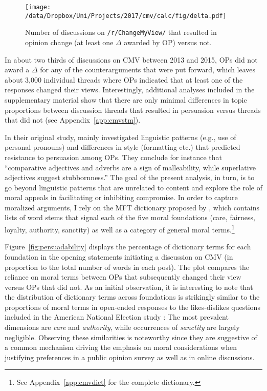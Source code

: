 \begin{figure}[ht]
\centering
\texttt{[image: /data/Dropbox/Uni/Projects/2017/cmv/calc/fig/delta.pdf]}
\caption[Number of original posts on \texttt{/r/ChangeMyView/} that resulted in opinion change]{Number of discussions on \texttt{/r/ChangeMyView/} that resulted in opinion change (at least one $\Delta$ awarded by OP) versus not.}\label{fig:delta}
\end{figure}

In about two thirds of discussions on CMV between 2013 and 2015, OPs did not award a $\Delta$ for any of the counterarguments that were put forward, which leaves about 3,000 individual threads where OPs indicated that at least one of the responses changed their views. Interestingly, additional analyses included in the supplementary material show that there are only minimal differences in topic proportions between discussion threads that resulted in persuasion versus threads that did not (see Appendix~\ref{app:cmvstm}).

In their original study, \citet{tan2016winning} mainly investigated linguistic patterns (e.g., use of personal pronouns) and differences in style (formatting etc.) that predicted resistance to persuasion among OPs. They conclude for instance that ``comparative adjectives and adverbs are a sign of malleability, while superlative adjectives suggest stubbornness.'' The goal of the present analysis, in turn, is to go beyond linguistic patterns that are unrelated to content and explore the role of moral appeals in facilitating or inhibiting compromise. In order to capture moralized arguments, I rely on the MFT dictionary proposed by \citet{graham2009liberals}, which contains lists of word stems that signal each of the five moral foundations (care, fairness, loyalty, authority, sanctity) as well as a category of general moral terms.\footnote{See Appendix~\ref{app:cmvdict} for the complete dictionary.}

Figure~\ref{fig:persuadability} displays the percentage of dictionary terms for each foundation in the opening statements initiating a discussion on CMV (in proportion to the total number of words in each post). The plot compares the reliance on moral terms between OPs that subsequently changed their view versus OPs that did not. As an initial observation, it is interesting to note that the distribution of dictionary terms across foundations is strikingly similar to the proportions of moral terms in open-ended responses to the likes-dislikes questions included in the American National Election study \citep[c.f.,][]{kraft2018measuring}: The most prevalent dimensions are \textit{care} and \textit{authority}, while occurrences of \textit{sanctity} are largely negligible. Observing these similarities is noteworthy since they are suggestive of a common mechanism driving the emphasis on moral considerations when justifying preferences in a public opinion survey as well as in online discussions.

